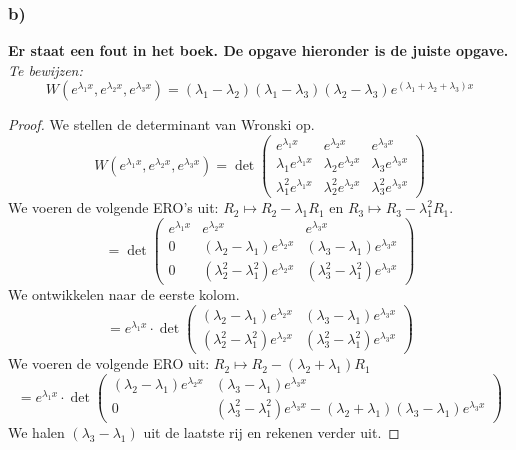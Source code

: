 \documentclass[lineaire_algebra_oplossingen.tex]{subfiles}
\begin{document}
\subsubsection*{b)}
\textbf{Er staat een fout in het boek. De opgave hieronder is de juiste opgave.}\\
\textit{Te bewijzen:}
\[
W(e^{\lambda_1x}, e^{\lambda_2x}, e^{\lambda_3x}) = (\lambda_1-\lambda_2) (\lambda_1-\lambda_3) (\lambda_2-\lambda_3)
e^{(\lambda_1 + \lambda_2 + \lambda_3)x}
\]
\begin{proof}
We stellen de determinant van Wronski op.
\[
W(e^{\lambda_1x}, e^{\lambda_2x}, e^{\lambda_3x})
= \det
\begin{pmatrix}
e^{\lambda_1x}             & e^{\lambda_2x}             & e^{\lambda_3x} \\
\lambda_1 e^{\lambda_1x}   & \lambda_2 e^{\lambda_2x}   & \lambda_3 e^{\lambda_3x} \\
\lambda_1^2 e^{\lambda_1x} & \lambda_2^2 e^{\lambda_2x} & \lambda_3^2 e^{\lambda_3x}
\end{pmatrix}
\]
We voeren de volgende ERO's uit: $R_2 \longmapsto R_2 - \lambda_1R_1$ en $R_3 \longmapsto R_3 - \lambda_1^2R_1$.
\[
= \det
\begin{pmatrix}
e^{\lambda_1x} & e^{\lambda_2x}                           & e^{\lambda_3x} \\
0              & (\lambda_2-\lambda_1) e^{\lambda_2x}     & (\lambda_3-\lambda_1) e^{\lambda_3x} \\
0              & (\lambda_2^2-\lambda_1^2) e^{\lambda_2x} & (\lambda_3^2-\lambda_1^2) e^{\lambda_3x}
\end{pmatrix}
\]
We ontwikkelen naar de eerste kolom.
\[
= e^{\lambda_1x} \cdot \det
\begin{pmatrix}
(\lambda_2-\lambda_1) e^{\lambda_2x}     & (\lambda_3-\lambda_1) e^{\lambda_3x} \\
(\lambda_2^2-\lambda_1^2) e^{\lambda_2x} & (\lambda_3^2-\lambda_1^2) e^{\lambda_3x}
\end{pmatrix}
\]
We voeren de volgende ERO uit: $R_2 \longmapsto R_2 - (\lambda_2+\lambda_1)R_1$
\[
= e^{\lambda_1x} \cdot \det
\begin{pmatrix}
(\lambda_2-\lambda_1) e^{\lambda_2x} & (\lambda_3-\lambda_1) e^{\lambda_3x} \\
0                                    & (\lambda_3^2-\lambda_1^2) e^{\lambda_3x} - (\lambda_2+\lambda_1) (\lambda_3-\lambda_1) e^{\lambda_3x}
\end{pmatrix}
\]
We halen $(\lambda_3-\lambda_1)$ uit de laatste rij en rekenen verder uit.

\end{proof}
\end{document}
